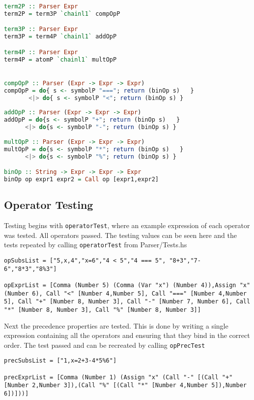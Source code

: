 \documentclass{article}
\begin{document}
\begin{lstlisting}[language=Haskell]
term2P :: Parser Expr
term2P = term3P `chainl1` compOpP

term3P :: Parser Expr
term3P = term4P `chainl1` addOpP

term4P :: Parser Expr
term4P = atomP `chainl1` multOpP


compOpP :: Parser (Expr -> Expr -> Expr)
compOpP = do{ s <- symbolP "==="; return (binOp s)   }
       <|> do{ s <- symbolP "<"; return (binOp s) }
       
addOpP :: Parser (Expr -> Expr -> Expr)
addOpP = do{s <- symbolP "+"; return (binOp s)   }
      <|> do{s <- symbolP "-"; return (binOp s) }
      
multOpP :: Parser (Expr -> Expr -> Expr)
multOpP = do{s <- symbolP "*"; return (binOp s)   }
      <|> do{s <- symbolP "%"; return (binOp s) }

binOp :: String -> Expr -> Expr -> Expr
binOp op expr1 expr2 = Call op [expr1,expr2]
\end{lstlisting}

\subsection{Operator Testing}
Testing begins with \texttt{operatorTest}, where an example expression of each operator was tested. All operators passed. The testing values can be seen here and the tests repeated by calling \texttt{operatorTest} from Parser/Tests.hs 
\begin{verbatim}
opSubsList = ["5,x,4","x=6","4 < 5","4 === 5", "8+3","7-6","8*3","8%3"]

opExprList = [Comma (Number 5) (Comma (Var "x") (Number 4)),Assign "x" (Number 6), Call "<" [Number 4,Number 5], Call "===" [Number 4,Number 5], Call "+" [Number 8, Number 3], Call "-" [Number 7, Number 6], Call "*" [Number 8, Number 3], Call "%" [Number 8, Number 3]]
\end{verbatim}

Next the precedence properties are tested. This is done by writing a single expression containing all the operators and ensuring that they bind in the correct order. The test passed and can be recreated by calling \texttt{opPrecTest}

\begin{verbatim}
precSubsList = ["1,x=2+3-4*5%6"]
  
precExprList = [Comma (Number 1) (Assign "x" (Call "-" [(Call "+" [Number 2,Number 3]),(Call "%" [(Call "*" [Number 4,Number 5]),Number 6])]))]
\end{verbatim}
\end{document}
